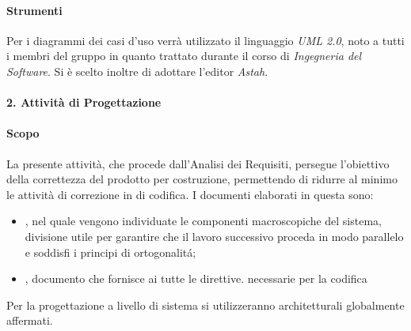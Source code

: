 			\paragraph*{Strumenti}
				Per i diagrammi dei casi d'uso verrà utilizzato il linguaggio \textit{UML 2.0},
				noto a tutti i membri del gruppo in quanto trattato durante il corso
				di \textit{Ingegneria del Software}.
				Si \`e scelto inoltre di adottare l'editor  \textit{Astah}.   %
			
			
		\paragraph*{2. Attività di Progettazione}
			\paragraph*{Scopo}
		        La presente attivit\`a, che procede dall'Analisi dei Requisiti, persegue l'obiettivo
		        della correttezza del prodotto per costruzione, permettendo di ridurre al minimo le attività di correzione
		        in  di codifica.
                        I documenti elaborati in questa  sono:
                        \begin{itemize}
                        \item {}, nel quale vengono individuate le componenti macroscopiche del sistema,
                          divisione utile per garantire che il lavoro successivo proceda in modo parallelo e soddisfi i principi di ortogonalit\'a;
                        \item {}, documento che fornisce ai  tutte le direttive. necessarie per la codifica
                        \end{itemize}
		        Per la progettazione a livello di sistema si utilizzeranno  architetturali globalmente affermati.
                 
